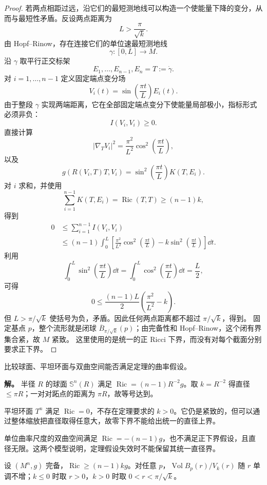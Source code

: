 \begin{proof}
若两点相距过远，沿它们的最短测地线可以构造一个使能量下降的变分，从而与最短性矛盾。反设两点距离为
\[
L>\frac{\pi}{\sqrt k}.
\]
由 Hopf--Rinow，存在连接它们的单位速最短测地线
\[
\gamma:[0,L]\to M.
\]
沿 $\gamma$ 取平行正交标架
\[
E_1,\ldots,E_{n-1},E_n=T:=\dot\gamma.
\]
对 $i=1,\ldots,n-1$ 定义固定端点变分场
\[
V_i(t)
=\sin\!\left(\frac{\pi t}{L}\right)E_i(t).
\]
由于整段 $\gamma$ 实现两端距离，它在全部固定端点变分下使能量局部极小，指标形式必须非负：
\[
I(V_i,V_i)\ge0.
\]
直接计算
\[
|\nabla_TV_i|^2
=\frac{\pi^2}{L^2}
\cos^2\!\left(\frac{\pi t}{L}\right),
\]
以及
\[
g(R(V_i,T)T,V_i)
=\sin^2\!\left(\frac{\pi t}{L}\right)
K(T,E_i).
\]
对 $i$ 求和，并使用
\[
\sum_{i=1}^{n-1}K(T,E_i)
=\operatorname{Ric}(T,T)
\ge(n-1)k,
\]
得到
\[
\begin{aligned}
0
&\le\sum_{i=1}^{n-1}I(V_i,V_i)\\
&\le(n-1)
\int_0^L
\left[
\frac{\pi^2}{L^2}
\cos^2\!\left(\frac{\pi t}{L}\right)
-k\sin^2\!\left(\frac{\pi t}{L}\right)
\right]\dd t.
\end{aligned}
\]
利用
\[
\int_0^L\sin^2\!\left(\frac{\pi t}{L}\right)\dd t
=
\int_0^L\cos^2\!\left(\frac{\pi t}{L}\right)\dd t
=\frac L2,
\]
可得
\[
0
\le
\frac{(n-1)L}{2}
\left(
\frac{\pi^2}{L^2}-k
\right).
\]
但 $L>\pi/\sqrt k$ 使括号为负，矛盾。因此任何两点距离都不超过 $\pi/\sqrt k$，得到。
固定基点 $p$，整个流形就是闭球 $\overline B_{\pi/\sqrt k}(p)$；由完备性和 Hopf--Rinow，这个闭有界集合紧，故 $M$ 紧致。
这里使用的是统一的正 Ricci 下界，而没有对每个截面分别要求正下界。
\end{proof}

\begin{exbox}
比较球面、平坦环面与双曲空间能否满足定理的曲率假设。

\textbf{解。} 半径 $R$ 的球面 $\mathbb S^n(R)$ 满足 $\operatorname{Ric}=(n-1)R^{-2}g$。取 $k=R^{-2}$ 得直径 $\le\pi R$；一对对跖点的距离为 $\pi R$，故等号达到。

平坦环面 $T^n$ 满足 $\operatorname{Ric}=0$，不存在定理要求的 $k>0$。它仍是紧致的，但可以通过整体缩放把直径取得任意大，故零下界不能给出统一的直径上界。

单位曲率尺度的双曲空间满足 $\operatorname{Ric}=-(n-1)g$，也不满足正下界假设，且直径无限。这两个模型说明，定理假设失效时不能保留其统一直径界。
\end{exbox}

\begin{theorem}
设 $(M^n,g)$ 完备，$\operatorname{Ric}\ge(n-1)kg$。对任意 $p$，$\operatorname{Vol}B_p(r)/V_k(r)$ 随 $r$ 单调不增；$k\le0$ 时取 $r>0$，$k>0$ 时取 $0<r<\pi/\sqrt k$。
\end{theorem}

